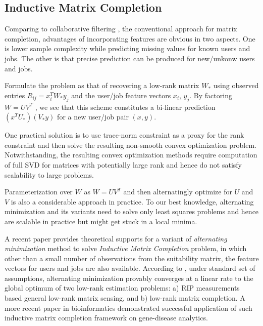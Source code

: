 \documentclass{article} %
\begin{document}
\subsection{Inductive Matrix Completion}
Comparing to collaborative filtering
, the conventional approach for matrix completion, advantages of incorporating
features are obvious in two aspects. One is lower sample complexity while
predicting missing values for known users and jobs.   The other is that precise
prediction can be produced for new/unkonw users and jobs. 

Formulate the problem as that of recovering a low-rank matrix $W_*$ using
observed entries $R_{ij} = x_i^T W_{*} y_j$ and the user/job feature vectors $x_i$, $y_j$. By
factoring $W = U V^T$ , we see that this scheme constitutes a bi-linear
prediction $(x^T U_{*})(V_{*} y)$ for a new user/job pair $(x, y)$.

One practical solution is to use trace-norm constraint as a proxy for the rank
constraint and then solve the resulting non-smooth convex optimization
problem. Notwithstanding, the resulting convex optimization methods require
computation of full SVD for matrices with potentially large rank and hence do
not satisfy scalability to large problems.

Parameterization over $W$ as $W = U V^T$ and then alternatingly optimize for
$U$ and $V$ is also a considerable approach in practice. To our best
knowledge, alternating minimization and its variants need to solve only least
squares problems and hence are scalable in practice but might get stuck in a
local minima.

A recent paper \cite{jain2013provable} provides theoretical
supports for a variant of {\it alternating minimization} method to solve
{\it Inductive Matrix Completion} problem, in which other than a small number
of observations from the suitability matrix, the feature vectors for users and
jobs are also available.
According to \cite{jain2013provable}, under standard set of assumptions,
alternating minimization provably converges at a linear rate to the global
optimum of two low-rank estimation problems: a) RIP measurements based general
low-rank matrix sensing, and b) low-rank matrix completion. A more recent
paper \cite{natarajan2014inductive} in bioinformatics demonstrated successful
application of such inductive matrix completion
framework on gene-disease analytics.
\end{document}
